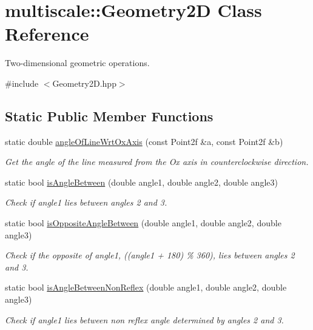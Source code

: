 \hypertarget{classmultiscale_1_1Geometry2D}{\section{multiscale\-:\-:\-Geometry2\-D \-Class \-Reference}
\label{classmultiscale_1_1Geometry2D}
}


\-Two-\/dimensional geometric operations.  




{\ttfamily \#include $<$\-Geometry2\-D.\-hpp$>$}

\subsection*{\-Static \-Public \-Member \-Functions}
\begin{DoxyCompactItemize}
\item 
static double \hyperlink{classmultiscale_1_1Geometry2D_a5c91b7d536f0445afa9c68c73ffe4139}{angle\-Of\-Line\-Wrt\-Ox\-Axis} (const \-Point2f \&a, const \-Point2f \&b)
\begin{DoxyCompactList}\small\item\em \-Get the angle of the line measured from the \-Ox axis in counterclockwise direction. \end{DoxyCompactList}\item 
static bool \hyperlink{classmultiscale_1_1Geometry2D_a6555ae4c2762e25444bc0874e9bbc535}{is\-Angle\-Between} (double angle1, double angle2, double angle3)
\begin{DoxyCompactList}\small\item\em \-Check if angle1 lies between angles 2 and 3. \end{DoxyCompactList}\item 
static bool \hyperlink{classmultiscale_1_1Geometry2D_aa373f78afdba238ebe3bafaac6076aef}{is\-Opposite\-Angle\-Between} (double angle1, double angle2, double angle3)
\begin{DoxyCompactList}\small\item\em \-Check if the opposite of angle1, ((angle1 + 180) \% 360), lies between angles 2 and 3. \end{DoxyCompactList}\item 
static bool \hyperlink{classmultiscale_1_1Geometry2D_a907466755f2d460e95e2bace5b386768}{is\-Angle\-Between\-Non\-Reflex} (double angle1, double angle2, double angle3)
\begin{DoxyCompactList}\small\item\em \-Check if angle1 lies between non reflex angle determined by angles 2 and 3. \end{DoxyCompactList}\item 

\end{DoxyCompactItemize}
